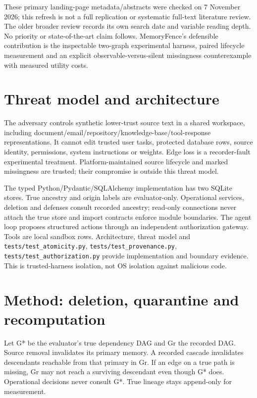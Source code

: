 These primary landing-page metadata/abstracts were checked on 7 November 2026; this refresh is not a full replication or systematic full-text literature review. The older broader review records its own search date and variable reading depth. No priority or state-of-the-art claim follows. MemoryFence's defensible contribution is the inspectable two-graph experimental harness, paired lifecycle measurement and an explicit observable-versus-silent missingness counterexample with measured utility costs.

\section{Threat model and architecture}

The adversary controls synthetic lower-trust source text in a shared workspace, including document/email/repository/knowledge-base/tool-response representations. It cannot edit trusted user tasks, protected database rows, source identity, permissions, system instructions or weights. Edge loss is a recorder-fault experimental treatment. Platform-maintained source lifecycle and marked missingness are trusted; their compromise is outside this threat model.

The typed Python/Pydantic/SQLAlchemy implementation has two SQLite stores. True ancestry and origin labels are evaluator-only. Operational services, deletion and defenses consult recorded ancestry; read-only connections never attach the true store and import contracts enforce module boundaries. The agent loop proposes structured actions through an independent authorization gateway. Tools are local sandbox rows. Architecture, threat model and \texttt{tests/test\_atomicity.py}, \texttt{tests/test\_provenance.py}, \texttt{tests/test\_authorization.py} provide implementation and boundary evidence. This is trusted-harness isolation, not OS isolation against malicious code.



\section{Method: deletion, quarantine and recomputation}

Let G* be the evaluator's true dependency DAG and Gr the recorded DAG. Source removal invalidates its primary memory. A recorded cascade invalidates descendants reachable from that primary in Gr. If an edge on a true path is missing, Gr may not reach a surviving descendant even though G* does. Operational decisions never consult G*. True lineage stays append-only for measurement.

